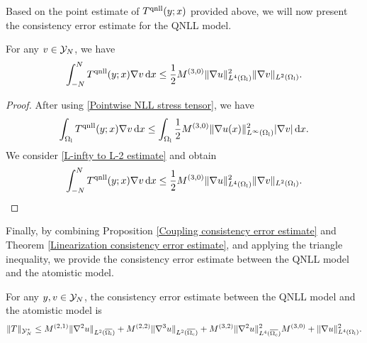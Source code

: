 Based on the point estimate of $T^{{\rm qnll}}(y;x)$ provided above, we will now present the consistency error estimate for the QNLL model.

\begin{theorem}\label{Linearization consistency error estimate}
	For any $v \in \mathcal{Y}_N$, we have
	\begin{equation}\label{Linearization error estimate}
		\int_{-N}^{N} T^{{\rm qnll}}(y;x) \nabla v\,\text{d} x\le \frac{1}{2} M^{(3,0)}\Vert \nabla u\Vert^{2}_{L^{4}(\Omega_{{\rm l}})}\Vert \nabla v\Vert_{L^{2}(\Omega_{{\rm l}})}.
	\end{equation} 
\end{theorem}
\begin{proof}
	After using \eqref{Pointwise NLL stress tensor}, we have
	\begin{equation*}
		\int_{\Omega_{{\rm l}}} T^{{\rm qnll}}(y;x)  \nabla v \,\text{d} x\le \int_{\Omega_{{\rm l}}} \frac{1}{2}M^{(3,0)}\Vert \nabla u(x)\Vert^{2}_{L^{\infty}(\Omega_{{\rm l}})} \vert \nabla v \vert \,\text{d} x.
	\end{equation*}
	We consider \eqref{L-infty to L-2 estimate} and obtain
	\begin{equation*}
		\int_{-N}^{N} T^{{\rm qnll}}(y;x) \nabla v\,\text{d} x\le \frac{1}{2} M^{(3,0)}\Vert \nabla u\Vert^{2}_{L^{4}(\Omega_{{\rm l}})}\Vert \nabla v\Vert_{L^{2}(\Omega_{{\rm l}})}.
	\end{equation*}
\end{proof}

Finally, by combining Proposition \ref{Coupling consistency error estimate} and Theorem \ref{Linearization consistency error estimate}, and applying the triangle inequality, we provide the consistency error estimate between the QNLL model and the atomistic model.

\begin{theorem}
	For any $y, v \in \mathcal{Y}_{N}$, the consistency error estimate between the QNLL model and the atomistic model is
	\begin{equation}\label{QNLL consistency error estimate}
		\Vert T \Vert_{\mathcal{Y}_{N}^{*}} \le M^{(2,1)}\Vert \nabla^{2} u\Vert_{L^{2}(\overline{\Omega_{{\rm i}}})} +M^{(2,2)}\Vert \nabla^{3}u \Vert_{L^{2}(\overline{\Omega_{{\rm c}}})}+M^{(3,2)}\Vert \nabla^{2}u \Vert^{2}_{L^{4}(\overline{\Omega_{{\rm c}}})}M^{(3,0)}+\Vert \nabla u \Vert^{2}_{L^{4}(\Omega_{{\rm l}})}.
	\end{equation}
\end{theorem}






